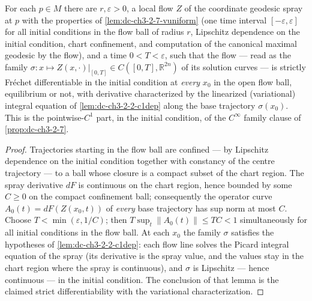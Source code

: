 \begin{lemma}
  \label{lem:dc-ch3-2-7-c1flow}
  \leanok
  For each $p \in M$ there are $r, \varepsilon > 0$, a local flow $Z$ of the
  coordinate geodesic spray at $p$ with the properties of
  \cref{lem:dc-ch3-2-7-vuniform} (one time interval $[-\varepsilon,
  \varepsilon]$ for all initial conditions in the flow ball of radius $r$,
  Lipschitz dependence on the initial condition, chart confinement, and
  computation of the canonical maximal geodesic by the flow), and a time
  $0 < T < \varepsilon$, such that the flow — read as the family
  $\sigma : x \mapsto Z(x, \cdot)|_{[0,T]} \in C([0,T], \mathbb{R}^{2n})$ of
  its solution curves — is strictly Fr\'echet differentiable in the initial
  condition at \emph{every} $x_0$ in the open flow ball, equilibrium or not,
  with derivative characterized by the linearized (variational) integral
  equation of \cref{lem:dc-ch3-2-2-c1dep} along the base trajectory
  $\sigma(x_0)$. This is the pointwise-$C^1$ part, in the initial condition,
  of the $C^\infty$ family clause of \cref{prop:dc-ch3-2-7}.
\end{lemma}
\begin{proof}
  \sketch
  \leanok
  Trajectories starting in the flow ball are confined — by Lipschitz
  dependence on the initial condition together with constancy of the centre
  trajectory — to a ball whose closure is a compact subset of the chart
  region. The spray derivative $dF$ is continuous on the chart region, hence
  bounded by some $C \ge 0$ on the compact confinement ball; consequently the
  operator curve $A_0(t) = dF(Z(x_0, t))$ of \emph{every} base trajectory has
  sup norm at most $C$. Choose $T < \min(\varepsilon, 1/C)$; then
  $T \sup_t \|A_0(t)\| \le T C < 1$ simultaneously for all initial conditions
  in the flow ball. At each $x_0$ the family $\sigma$ satisfies the
  hypotheses of \cref{lem:dc-ch3-2-2-c1dep}: each flow line solves the Picard
  integral equation of the spray (its derivative is the spray value, and the
  values stay in the chart region where the spray is continuous), and
  $\sigma$ is Lipschitz — hence continuous — in the initial condition. The
  conclusion of that lemma is the claimed strict differentiability with the
  variational characterization.
\end{proof}

